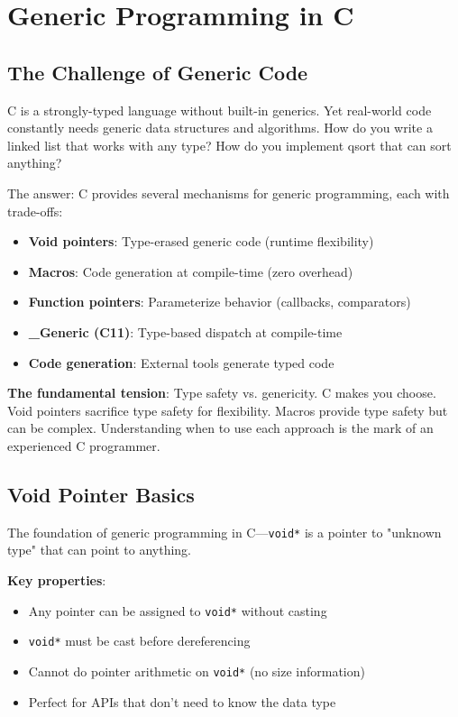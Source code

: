 \chapter{Generic Programming in C}

\section{The Challenge of Generic Code}

C is a strongly-typed language without built-in generics. Yet real-world code constantly needs generic data structures and algorithms. How do you write a linked list that works with any type? How do you implement qsort that can sort anything?

The answer: C provides several mechanisms for generic programming, each with trade-offs:

\begin{itemize}
    \item \textbf{Void pointers}: Type-erased generic code (runtime flexibility)
    \item \textbf{Macros}: Code generation at compile-time (zero overhead)
    \item \textbf{Function pointers}: Parameterize behavior (callbacks, comparators)
    \item \textbf{\_Generic (C11)}: Type-based dispatch at compile-time
    \item \textbf{Code generation}: External tools generate typed code
\end{itemize}

\textbf{The fundamental tension}: Type safety vs. genericity. C makes you choose. Void pointers sacrifice type safety for flexibility. Macros provide type safety but can be complex. Understanding when to use each approach is the mark of an experienced C programmer.

\section{Void Pointer Basics}

The foundation of generic programming in C---\texttt{void*} is a pointer to "unknown type" that can point to anything.

\textbf{Key properties}:
\begin{itemize}
    \item Any pointer can be assigned to \texttt{void*} without casting
    \item \texttt{void*} must be cast before dereferencing
    \item Cannot do pointer arithmetic on \texttt{void*} (no size information)
    \item Perfect for APIs that don't need to know the data type
\end{itemize}

